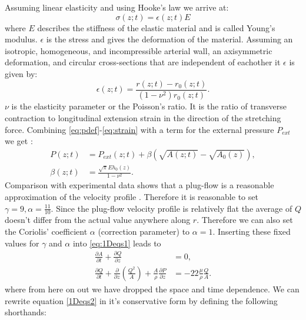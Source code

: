 \documentclass[a4paper, oneside]{discothesis}
\begin{document}
Assuming linear elasticity and using Hooke's law \cite{hooke1678lectures} we arrive at:
\begin{equation}
	\sigma(z;t) = \epsilon(z;t) E \label{eq:stress}
\end{equation}
where $E$ describes the stiffness of the elastic material and is called Young's modulus.
$\epsilon$ is the stress and gives the deformation of the material.
Assuming an isotropic, homogeneous, and incompressible arterial wall, an axisymmetric deformation, and circular cross-sections that are independent of eachother it $\epsilon$ is given by:
\begin{equation}
	\epsilon(z;t) = \frac{r(z;t)-r_0(z;t)}{ (1-\nu^2) r_0(z;t)}. \label{eq:strain}
\end{equation}
$\nu$ is the elasticity parameter or the Poisson's ratio.
It is the ratio of transverse contraction to longitudinal extension strain in the direction of the stretching force.
Combining \autoref{eq:pdef}-\autoref{eq:strain} with a term for the external pressure $P_{ext}$ we get \cite{sherwin2003one} \cite{sherwin2003computational}: 
\begin{align} 
	P(z;t) &= P_{ext}(z;t) + \beta \left( \sqrt{A(z;t)} - \sqrt{A_0(z)} \right),  \label{eq:p_tot}\\
	\beta(z;t) &=  \frac{\sqrt{\pi} E h_0(z)}{1-\nu^2}.
\end{align}
Comparison with experimental data shows that a plug-flow is a reasonable approximation of the velocity profile \cite{hunter1972numerical} \cite{smith2000generation} \cite{smith2002anatomically}.
Therefore it is reasonable to set $\gamma = 9, \alpha = \frac{11}{10}$.
Since the plug-flow velocity profile is relatively flat the average of $Q$ doesn't differ from the actual value anywhere along $r$.
Therefore we can also set the Coriolis' coefficient $\alpha$ (correction parameter) to $\alpha = 1$. \cite{formaggia2010cardiovascular}
Inserting these fixed values for $\gamma$ and $\alpha$ into  \autoref{eq:1Deqs1} leads to 
\begin{equation}
		\begin{aligned} 
			\frac{\partial A}{\partial t} + \frac{\partial Q}{\partial z} &= 0, \\ 
			\frac{\partial Q}{\partial t} + \frac{\partial}{\partial z}\left(\frac{Q^2}{A} \right) + \frac{A}{\rho} \frac{\partial P}{\partial z} &= -22 \frac{\mu}{\rho} \frac{Q}{A}.
		\end{aligned} \label{1Deqs2}
\end{equation}
where from here on out we have dropped the space and time dependence.
We can rewrite equation \ref{1Deqs2} in it's conservative form by defining the following shorthands:
\end{document}
